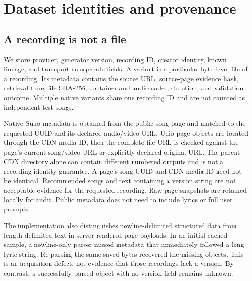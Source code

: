 \documentclass[10pt,a4paper]{article}
\begin{document}
\section{Dataset identities and provenance}

\subsection{A recording is not a file}
We store provider, generator version, recording ID, creator identity, known
lineage, and transport as separate fields. A variant is a particular byte-level
file of a recording. Its metadata contains the source URL, source-page evidence
hash, retrieval time, file SHA-256, container and audio codec, duration, and
validation outcome. Multiple native variants share one recording ID and are
not counted as independent test songs.

Native Suno metadata is obtained from the public song page and matched to the
requested UUID and its declared audio/video URL. Udio page objects are located
through the CDN media ID, then the complete file URL is checked against the
page's current song/video URL or explicitly declared original URL. The parent
CDN directory alone can contain different numbered outputs and is not a
recording-identity guarantee. A page's song UUID and CDN media ID need not be identical.
Recommended songs and text containing a version string are not acceptable
evidence for the requested recording. Raw page snapshots are retained locally
for audit. Public metadata does not need to include lyrics or full user prompts.

The implementation also distinguishes newline-delimited structured data from
length-delimited text in server-rendered page payloads. In an initial cached
sample, a newline-only parser missed metadata that immediately followed a long
lyric string. Re-parsing the same saved bytes recovered the missing objects.
This is an acquisition defect, not evidence that those recordings lack a version.
By contrast, a successfully parsed object with no version field remains unknown.
\end{document}
